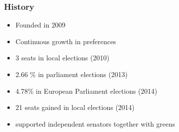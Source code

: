 \begin{frame}
	\frametitle{History}
	\begin{itemize}
		\item Founded in 2009
		\item Continuous growth in preferences 
		\item 3 seats in local elections (2010)
		\item 2.66 \% in parliament elections (2013)
		\item 4.78\% in European Parliament elections (2014)
		\item 21 seats gained in local elections (2014)
		\item supported independent senators together with greens
	\end{itemize}
	
\end{frame}

